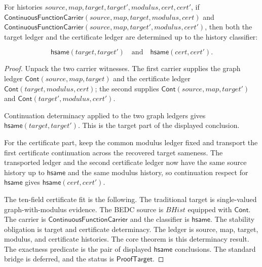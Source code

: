 \begin{theorem}
\label{thm:continuous-function-carrier-target-cert-deterministic}
For histories $source,map,target,target',modulus,cert,cert'$, if
$\mathsf{ContinuousFunctionCarrier}(source,map,target,modulus,cert)$ and
$\mathsf{ContinuousFunctionCarrier}(source,map,target',modulus,cert')$, then
both the target ledger and the certificate ledger are determined up to the
history classifier:

$$
\mathsf{hsame}(target,target')\quad\text{and}\quad
\mathsf{hsame}(cert,cert').
$$
\end{theorem}
\begin{proof}
Unpack the two carrier witnesses. The first carrier supplies the graph ledger
$\mathsf{Cont}(source,map,target)$ and the certificate ledger
$\mathsf{Cont}(target,modulus,cert)$; the second supplies
$\mathsf{Cont}(source,map,target')$ and
$\mathsf{Cont}(target',modulus,cert')$.

Continuation determinacy applied to the two graph ledgers gives
$\mathsf{hsame}(target,target')$. This is the target part of the displayed
conclusion.

For the certificate part, keep the common modulus ledger fixed and transport
the first certificate continuation across the recovered target sameness. The
transported ledger and the second certificate ledger now have the same source
history up to $\mathsf{hsame}$ and the same modulus history, so continuation
respect for $\mathsf{hsame}$ gives $\mathsf{hsame}(cert,cert')$.

The ten-field certificate fit is the following. The traditional target is
single-valued graph-with-modulus evidence. The BEDC source is $BHist$ equipped
with $\mathsf{Cont}$. The carrier is $\mathsf{ContinuousFunctionCarrier}$ and
the classifier is $\mathsf{hsame}$. The stability obligation is target and
certificate determinacy. The ledger is source, map, target, modulus, and
certificate histories. The core theorem is this determinacy result. The
exactness predicate is the pair of displayed $\mathsf{hsame}$ conclusions. The
standard bridge is deferred, and the status is $\mathsf{ProofTarget}$.
\end{proof}

